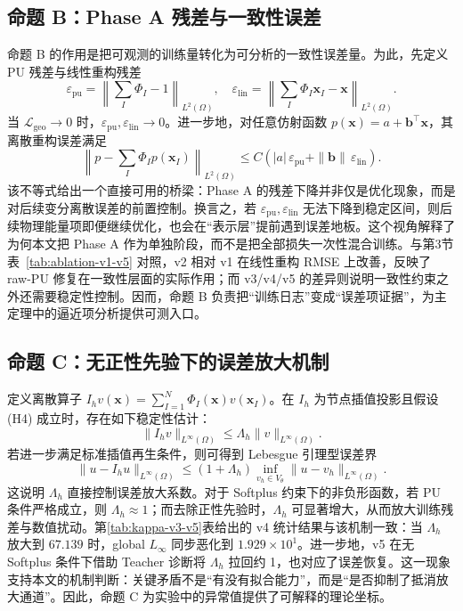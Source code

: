 ﻿\documentclass[lang=cn,a4paper]{elegantpaper}
\newcommand{\epspu}{\varepsilon_{\mathrm{pu}}}
\newcommand{\epslin}{\varepsilon_{\mathrm{lin}}}
\begin{document}
\subsection{命题 B：Phase A 残差与一致性误差}
命题 B 的作用是把可观测的训练量转化为可分析的一致性误差量。为此，先定义 PU 残差与线性重构残差
\begin{equation}
  \epspu=\left\|\sum_I\Phi_I-1\right\|_{L^2(\Omega)},\quad
  \epslin=\left\|\sum_I\Phi_I\bm{x}_I-\bm{x}\right\|_{L^2(\Omega)}.
\end{equation}
当 $\mathcal{L}_{\mathrm{geo}}\to 0$ 时，$\epspu,\epslin\to 0$。进一步地，对任意仿射函数 $p(\bm{x})=a+\bm{b}^\top\bm{x}$，其离散重构误差满足
\begin{equation}
  \left\|p-\sum_I\Phi_I p(\bm{x}_I)\right\|_{L^2(\Omega)}
  \le C\left(|a|\,\epspu+\|\bm{b}\|\,\epslin\right).
\end{equation}
该不等式给出一个直接可用的桥梁：Phase A 的残差下降并非仅是优化现象，而是对后续变分离散误差的前置控制。换言之，若 $\epspu,\epslin$ 无法下降到稳定区间，则后续物理能量项即便继续优化，也会在“表示层”提前遇到误差地板。这个视角解释了为何本文把 Phase A 作为单独阶段，而不是把全部损失一次性混合训练。与第3节表~\ref{tab:ablation-v1-v5} 对照，v2 相对 v1 在线性重构 RMSE 上改善，反映了 raw-PU 修复在一致性层面的实际作用；而 v3/v4/v5 的差异则说明一致性约束之外还需要稳定性控制。因而，命题 B 负责把“训练日志”变成“误差项证据”，为主定理中的逼近项分析提供可测入口。

\subsection{命题 C：无正性先验下的误差放大机制}
\label{subsec:lebesgue}
定义离散算子 $I_h v(\bm{x})=\sum_{I=1}^N\Phi_I(\bm{x})v(\bm{x}_I)$。在 $I_h$ 为节点插值投影且假设 (H4) 成立时，存在如下稳定性估计：
\begin{equation}
  \|I_h v\|_{L^\infty(\Omega)} \le \Lambda_h \|v\|_{L^\infty(\Omega)}.
\end{equation}
若进一步满足标准插值再生条件，则可得到 Lebesgue 引理型误差界
\begin{equation}
  \|u-I_hu\|_{L^\infty(\Omega)}
  \le (1+\Lambda_h)\inf_{v_h\in V_\theta}\|u-v_h\|_{L^\infty(\Omega)}.
\end{equation}
这说明 $\Lambda_h$ 直接控制误差放大系数。对于 Softplus 约束下的非负形函数，若 PU 条件严格成立，则 $\Lambda_h\approx1$；而去除正性先验时，$\Lambda_h$ 可显著增大，从而放大训练残差与数值扰动。第\ref{tab:kappa-v3-v5}表给出的 v4 统计结果与该机制一致：当 $\Lambda_h$ 放大到 $67.139$ 时，global $L_\infty$ 同步恶化到 $1.929\times10^1$。进一步地，v5 在无 Softplus 条件下借助 Teacher 诊断将 $\Lambda_h$ 拉回约 1，也对应了误差恢复。这一现象支持本文的机制判断：关键矛盾不是“有没有拟合能力”，而是“是否抑制了抵消放大通道”。因此，命题 C 为实验中的异常值提供了可解释的理论坐标。
\end{document}
